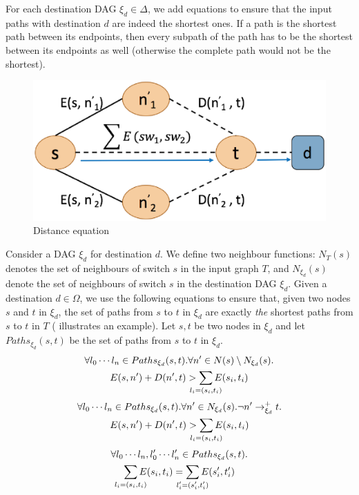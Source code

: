 For each destination DAG $\xi_d\in\Delta$, we add equations to ensure 
that the input paths with destination $d$ are indeed the shortest ones.
 If a path
is the shortest path between its endpoints, then every 
subpath of the path has to be the shortest between its endpoints
as well (otherwise the complete path would not be the shortest).
\begin{figure}[h!] 
	\centering
	\includegraphics[width=0.8\columnwidth]{figures/distanceEquation.eps}
	\caption{Distance equation
	} \label{fig:disteq}
\end{figure}
Consider a DAG $\xi_d$ for destination $d$. We define two neighbour
functions: $N_T(s)$ denotes the set of neighbours of switch $s$ 
in the input graph $T$, and $N_{\xi_d}(s)$ denote the set of
neighbours of switch $s$ in the destination DAG $\xi_d$. 
Given a destination $d\in \Omega$,
we use the following equations to ensure that, given two nodes $s$ and $t$ in
$\xi_d$, 
the set of paths from $s$ to $t$ in $\xi_d$ are
exactly
\emph{the} shortest paths from $s$ to $t$ in $T$ ( illustrates 
an example).
Let $s,t$ be two nodes in $\xi_d$ and let  $Paths_{\xi_d}(s,t)$ be the set of paths from $s$ to $t$ in $\xi_d$.
\begin{multline} \label{eq:uniq1}
		\forall l_0\cdots l_n\in Paths_{\xi_d}(s,t).
		\forall n' \in N(s) \setminus N_{\xi_d}(s). \\
		E(s, n') + D(n', t) > \sum_{\mathclap{\substack{l_i=(s_i,t_i)}}} 
		E(s_i, t_i) 
\end{multline}
\begin{multline} \label{eq:uniq2}
		\forall l_0\cdots l_n\in Paths_{\xi_d}(s,t).
		\forall n' \in N_{\xi_d}(s). \neg n'\rightarrow^+_{\xi_d} t.  \\
		E(s, n') + D(n', t) > \sum_{\mathclap{\substack{l_i=(s_i,t_i)}}} 
		E(s_i, t_i) 
\end{multline}
\begin{multline} \label{eq:uniq3}
		\forall l_0\cdots l_n, l_0'\cdots l_n'\in Paths_{\xi_d}(s,t).\\
		\sum_{\mathclap{\substack{l_i=(s_i,t_i)}}} 
		E(s_i, t_i)  =\sum_{\mathclap{\substack{l_i'=(s_i',t_i')}}} 
		E(s_i', t_i') 
\end{multline}
